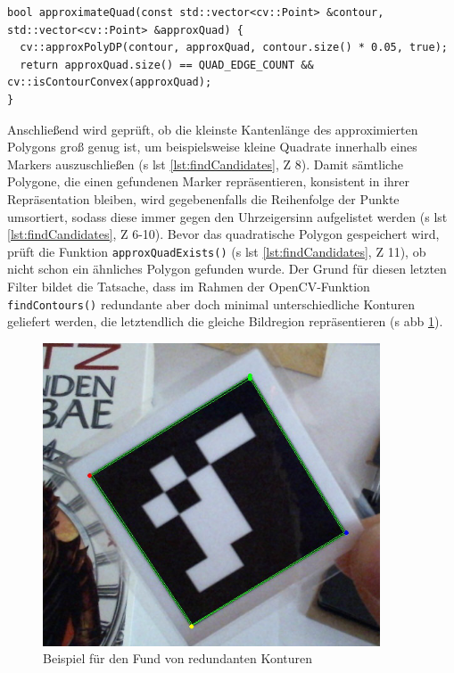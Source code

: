 \begin{lstlisting}[caption={Die Funktion \texttt{detectormarkerbased.cpp/approximateQuad()} approximiert aus einer gegeben Kontur ein Quadrat \acs{bzw} ein konvexes Polygon aus genau vier Punkten}, label={lst:approximateQuad}]
bool approximateQuad(const std::vector<cv::Point> &contour, std::vector<cv::Point> &approxQuad) {
  cv::approxPolyDP(contour, approxQuad, contour.size() * 0.05, true);
  return approxQuad.size() == QUAD_EDGE_COUNT && cv::isContourConvex(approxQuad);
}
\end{lstlisting}

\noindent Anschließend wird geprüft, ob die kleinste Kantenlänge des approximierten Polygons groß genug ist, um beispielsweise kleine Quadrate innerhalb eines Markers auszuschließen (\acs{s} \acs{lst} \ref{lst:findCandidates}, \acs{Z} 8). Damit sämtliche Polygone, die einen gefundenen Marker repräsentieren, konsistent in ihrer Repräsentation bleiben, wird gegebenenfalls die Reihenfolge der Punkte umsortiert, sodass diese immer gegen den Uhrzeigersinn aufgelistet werden (\acs{s} \acs{lst} \ref{lst:findCandidates}, \acs{Z} 6-10). Bevor das quadratische Polygon gespeichert wird, prüft die Funktion \texttt{approxQuadExists()} (\acs{s} \acs{lst} \ref{lst:findCandidates}, \acs{Z} 11), ob nicht schon ein ähnliches Polygon gefunden wurde. Der Grund für diesen letzten Filter bildet die Tatsache, dass im Rahmen der OpenCV-Funktion \texttt{findContours()} redundante aber doch minimal unterschiedliche Konturen geliefert werden, die letztendlich die gleiche Bildregion repräsentieren (\acs{s} \acs{abb} \ref{fig:DoubleExample}).

\begin{figure}[H]
\centering
\includegraphics[width=10cm]{Bilder/Implementierung/double.png}
\caption{Beispiel für den Fund von redundanten Konturen}
\label{fig:DoubleExample}
\end{figure}

